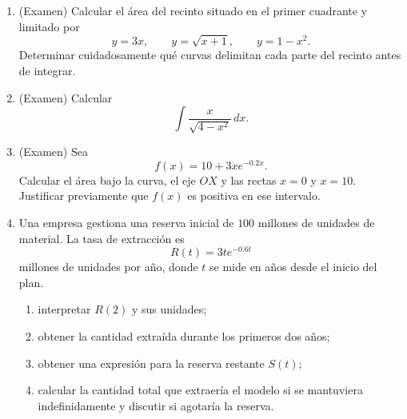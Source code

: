 \begin{enumerate}
\item (Examen) Calcular el área del recinto situado en el primer cuadrante y limitado por
\[
y=3x,
\qquad y=\sqrt{x+1},
\qquad y=1-x^2.
\]
Determinar cuidadosamente qué curvas delimitan cada parte del recinto antes de integrar.

\item (Examen) Calcular
\[
\int\frac{x}{\sqrt{4-x^2}}\,dx.
\]

\item (Examen) Sea
\[
f(x)=10+3xe^{-0.2x}.
\]
Calcular el área bajo la curva, el eje $OX$ y las rectas $x=0$ y $x=10$. Justificar previamente que $f(x)$ es positiva en ese intervalo.

\item Una empresa gestiona una reserva inicial de $100$ millones de unidades de material. La tasa de extracción es
\[
R(t)=3te^{-0.6t}
\]
millones de unidades por año, donde $t$ se mide en años desde el inicio del plan.
\begin{enumerate}[label=\alph*)]
\item interpretar $R(2)$ y sus unidades;
\item obtener la cantidad extraída durante los primeros dos años;
\item obtener una expresión para la reserva restante $S(t)$;
\item calcular la cantidad total que extraería el modelo si se mantuviera indefinidamente y discutir si agotaría la reserva.
\end{enumerate}

\end{enumerate}
